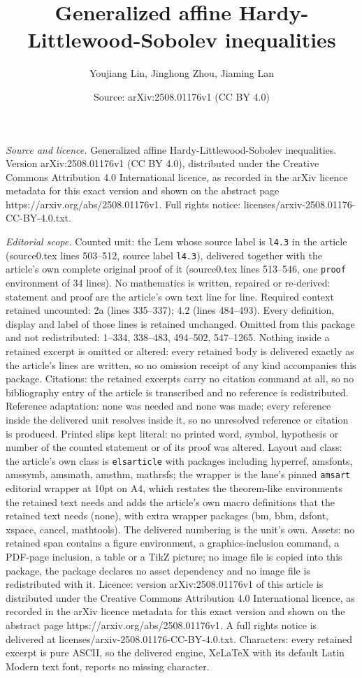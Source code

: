 \documentclass[10pt,a4paper]{amsart}
\title[Generalized affine Hardy-Littlewood-Sobolev inequalities]{Generalized affine Hardy-Littlewood-Sobolev inequalities}
\author{Youjiang Lin, Jinghong Zhou, Jiaming Lan}
\date{Source: arXiv:2508.01176v1 (CC BY 4.0)}
\begin{document}
\maketitle

\noindent\emph{Source and licence.} Generalized affine Hardy-Littlewood-Sobolev inequalities. Version arXiv:2508.01176v1 (CC BY 4.0), distributed under the Creative Commons Attribution 4.0 International licence, as recorded in the arXiv licence metadata for this exact version and shown on the abstract page https://arxiv.org/abs/2508.01176v1. Full rights notice: licenses/arxiv-2508.01176-CC-BY-4.0.txt.\par\smallskip

\noindent\textit{Editorial scope.} Counted unit: the Lem whose source label is \texttt{l4.3} in the article (source0.tex lines 503--512, source label \texttt{l4.3}), delivered together with the article's own complete original proof of it (source0.tex lines 513--546, one \texttt{proof} environment of 34 lines). No mathematics is written, repaired or re-derived: statement and proof are the article's own text line for line. Required context retained uncounted: 2a (lines 335--337); 4.2 (lines 484--493). Every definition, display and label of those lines is retained unchanged. Omitted from this package and not redistributed: 1--334, 338--483, 494--502, 547--1265. Nothing inside a retained excerpt is omitted or altered: every retained body is delivered exactly as the article's lines are written, so no omission receipt of any kind accompanies this package. Citations: the retained excerpts carry no citation command at all, so no bibliography entry of the article is transcribed and no reference is redistributed. Reference adaptation: none was needed and none was made; every reference inside the delivered unit resolves inside it, so no unresolved reference or citation is produced. Printed slips kept literal: no printed word, symbol, hypothesis or number of the counted statement or of its proof was altered. Layout and class: the article's own class is \texttt{elsarticle} with packages including hyperref, amsfonts, amssymb, amsmath, amsthm, mathrsfs; the wrapper is the lane's pinned \texttt{amsart} editorial wrapper at 10pt on A4, which restates the theorem-like environments the retained text needs and adds the article's own macro definitions that the retained text needs (none), with extra wrapper packages (bm, bbm, dsfont, xspace, cancel, mathtools). The delivered numbering is the unit's own. Assets: no retained span contains a figure environment, a graphics-inclusion command, a PDF-page inclusion, a table or a TikZ picture; no image file is copied into this package, the package declares no asset dependency and no image file is redistributed with it. Licence: version arXiv:2508.01176v1 of this article is distributed under the Creative Commons Attribution 4.0 International licence, as recorded in the arXiv licence metadata for this exact version and shown on the abstract page https://arxiv.org/abs/2508.01176v1. A full rights notice is delivered at licenses/arxiv-2508.01176-CC-BY-4.0.txt. Characters: every retained excerpt is pure ASCII, so the delivered engine, XeLaTeX with its default Latin Modern text font, reports no missing character.
\end{document}
